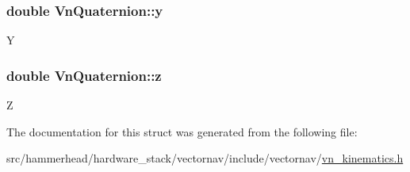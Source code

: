\subsubsection[{\texorpdfstring{y}{y}}]{\setlength{\rightskip}{0pt plus 5cm}double Vn\+Quaternion\+::y}\hypertarget{structVnQuaternion_a66810d0f7381549cc242a7ef796a7ece}{}\label{structVnQuaternion_a66810d0f7381549cc242a7ef796a7ece}
Y 
\subsubsection[{\texorpdfstring{z}{z}}]{\setlength{\rightskip}{0pt plus 5cm}double Vn\+Quaternion\+::z}\hypertarget{structVnQuaternion_aaf1fd55c03d49b64d8d36ae4f0a0e724}{}\label{structVnQuaternion_aaf1fd55c03d49b64d8d36ae4f0a0e724}
Z 

The documentation for this struct was generated from the following file\+:\begin{DoxyCompactItemize}
\item 
src/hammerhead/hardware\+\_\+stack/vectornav/include/vectornav/\hyperlink{vn__kinematics_8h}{vn\+\_\+kinematics.\+h}\end{DoxyCompactItemize}
